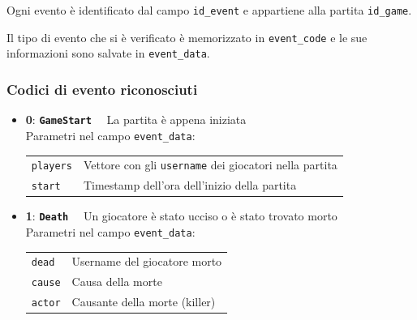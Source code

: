 \documentclass[10pt,a4paper]{article}
\newcommand{\eventcode}[4]{
\textbf{#1}: \textbf{\texttt{#2}}$\quad$ #3 \\
Parametri nel campo \texttt{event\_data}: \\
\begin{tabular}{ll}
#4
\end{tabular}
}
\begin{document}
Ogni evento è identificato dal campo \texttt{id\_event} e appartiene alla partita \texttt{id\_game}.

Il tipo di evento che si è verificato è memorizzato in \texttt{event\_code} e le sue informazioni sono salvate in \texttt{event\_data}.

\subsubsection*{Codici di evento riconosciuti}
\begin{itemize}
\item \eventcode{0}{GameStart}{La partita è appena iniziata}{
\texttt{players} & Vettore con gli \texttt{username} dei giocatori nella partita \\
\texttt{start}   & Timestamp dell'ora dell'inizio della partita
}
\item \eventcode{1}{Death}{Un giocatore è stato ucciso o è stato trovato morto}{
\texttt{dead}	& Username del giocatore morto \\
\texttt{cause}	& Causa della morte \\
\texttt{actor}	& Causante della morte (killer)
}
\end{itemize}

\newpage
\tableofcontents
\end{document}
